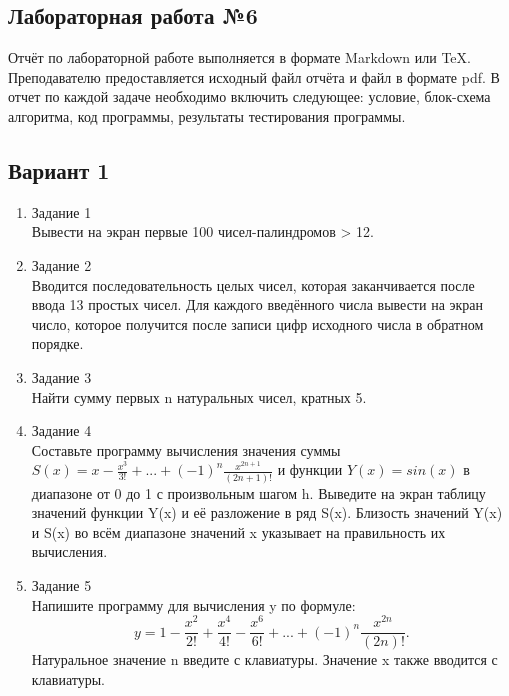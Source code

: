 \documentclass[a4paper]{article}
\begin{document}
	\begin{center}
		\section*{Лабораторная работа №6}
	Отчёт по лабораторной работе выполняется в формате Markdown или TeX. Преподавателю предоставляется исходный файл отчёта и файл в формате pdf. В отчет по каждой задаче необходимо включить следующее: условие, блок-схема алгоритма, код программы, результаты тестирования программы.
		 
		\subsection*{Вариант 1}
	\end{center}


	\begin{enumerate} 
		\item Задание 1 \\ 
			Вывести на экран первые 100 чисел-палиндромов > 12.
		\item Задание 2\\
			Вводится последовательность целых чисел, которая заканчивается после ввода 13 простых чисел. 
			Для каждого введённого числа вывести на экран число, 
			которое получится после записи цифр исходного числа в обратном порядке.\\
		\item Задание 3 \\
			Найти сумму первых n натуральных чисел, кратных 5.\\
		\item Задание 4 \\
			Составьте программу вычисления значения суммы  $S(x)=x-\frac{x^3}{3!}+...+(-1)^n\frac{x^{2n+1}}{(2n+1)!}$
			и функции $Y(x)=sin(x)$ в диапазоне от 0 до 1
			с произвольным шагом h. Выведите на экран таблицу значений функции Y(x) и её разложение в ряд S(x). Близость значений Y(x) и S(x) во всём диапазоне
			значений x указывает на правильность их вычисления.\\
		\item Задание 5 \\
			Напишите программу для вычисления y по формуле:
			$$y=1-\frac{x^2}{2!}+\frac{x^4}{4!}-\frac{x^6}{6!}+...+(-1)^n \frac{x^{2n}}{(2n)!}.$$
			Натуральное значение n введите с клавиатуры. Значение x также вводится с клавиатуры.\\
	\end{enumerate}
\end{document}
